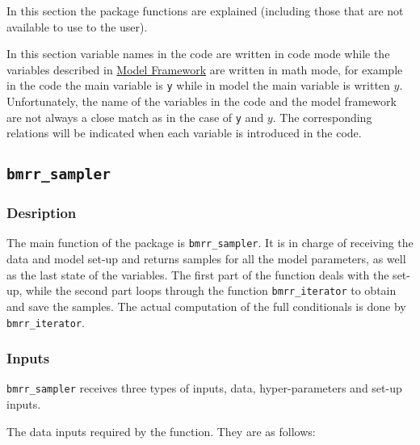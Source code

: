 \documentclass[
]{article}
\begin{document}
In this section the package functions are explained (including those that are
not available to use to the user).

In this section variable names in the code are written in code mode while the
variables described in \hyperref[modelFramework]{Model Framework} are written in math mode, for example
in the code the main variable is \texttt{y} while in model the main
variable is written \(y\). Unfortunately, the name of the variables in the code
and the model framework are not always a close match as in the case of \texttt{y} and
\(y\). The corresponding relations will be indicated when each variable is
introduced in the code.

\subsection{\texorpdfstring{\texttt{bmrr\_sampler}}{bmrr\_sampler}}\label{bmrr_sampler}

\subsubsection{Desription}\label{desription}

The main function of the package is \texttt{bmrr\_sampler}. It is in charge of receiving
the data and model set-up and returns samples for all the model parameters, as
well as the last state of the variables. The first part of the function deals
with the set-up, while the second part loops through the function \texttt{bmrr\_iterator}
to obtain and save the samples. The actual computation of the full conditionals
is done by \texttt{bmrr\_iterator}.

\subsubsection{Inputs}\label{inputs}

\texttt{bmrr\_sampler} receives three types of inputs, data, hyper-parameters and set-up
inputs.

The data inputs required by the function. They are as follows:
\end{document}
